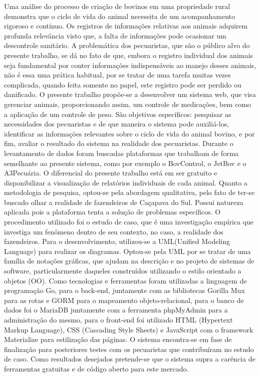 %
%

\begin{RESUMO}
\thispagestyle{empty}
	\begin{SingleSpace}

		\hspace{-1.2 cm}  Uma análise do processo de criação de bovinos em uma propriedade rural demonstra que o ciclo de vida do animal necessita de um acompanhamento rigoroso e contínuo. Os registros de informações relativas aos animais adquirem profunda relevância visto que, a falta de informações pode ocasionar um descontrole sanitário. A problemática dos pecuaristas, que são o público alvo do presente trabalho, se dá no fato de que, embora o registro individual dos animais seja fundamental por conter informações indispensáveis ao manejo desses animais, não é essa uma prática habitual, por se tratar de uma tarefa muitas vezes complicada, quando feita somente no papel, este registro pode ser perdido ou danificado. O presente trabalho propõe-se a desenvolver um sistema web, que visa gerenciar animais, proporcionando assim, um controle de medicações, bem como a aplicação de um controle de peso. São objetivos específicos: pesquisar as necessidades dos pecuaristas e de que maneira o sistema pode auxiliá-los, identificar as informações relevantes sobre o ciclo de vida do animal bovino, e por fim, avaliar o resultado do sistema na realidade dos pecuaristas. Durante o levantamento de dados foram buscadas plataformas que trabalham de forma semelhante ao presente sistema, como por exemplo o BovControl, o JetBov e o A3Pecuária. O diferencial do presente trabalho está em ser gratuito e disponibilizar a visualização de relatórios individuais de cada animal. Quanto a metodologia de pesquisa, optou-se pela abordagem qualitativa, pelo fato de ter-se buscado olhar a realidade de fazendeiros de Caçapava do Sul. Possui natureza aplicada pois a plataforma tenta a solução de problemas específicos. O procedimento utilizado foi o estudo de caso, que é uma investigação empírica que investiga um fenômeno dentro de seu contexto, no caso, a realidade dos fazendeiros. Para o desenvolvimento, utilizou-se a UML(Unified Modeling Language) para realizar os diagramas. Optou-se pela UML por se tratar de uma família de notações gráficas, que ajudam na descrição e no projeto de sistemas de software, particularmente daqueles construídos utilizando o estilo orientado a objetos (OO). Como tecnologias e ferramentas foram utilizadas a linguagem de programação Go, para o back-end, juntamente com as bibliotecas Gorilla Mux para as rotas e GORM para o mapeamento objeto-relacional, para o banco de dados foi o MariaDB juntamente com a ferramenta phpMyAdmin para a administração do mesmo, para o front-end foi utilizado HTML (Hypertext Markup Language), CSS (Cascading Style Sheets) e JavaScript com o framework Materialize para estilização das páginas. O sistema encontra-se em fase de finalização para posteriores testes com os pecuaristas que contribuíram no estudo de caso. Como resultados desejados pretende-se que o sistema supra a carência de ferramentas gratuitas e de código aberto para este mercado.


\end{SingleSpace}
\end{RESUMO}
